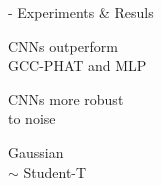 \begin{frame}[t]{\lantern - Experiments \& Resuls}
{    \begin{center}
        \textcolor{mygreen}{\cmark \: \parbox{8em}{CNNs outperform\\GCC-PHAT and MLP}}
        \hfill
        \textcolor{mygreen}{\cmark \: \parbox{8em}{CNNs more robust\\to noise}} %
        \hfill
        \textcolor{myred}{\xmark \: \parbox{8em}{Gaussian\\$\sim$ Student-T}}
    \end{center}
    }


\end{frame}



